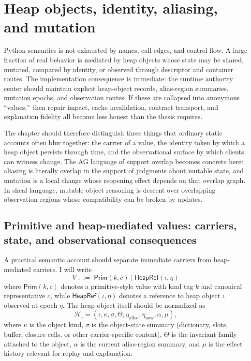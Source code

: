 \documentclass[11pt]{report}
\begin{document}
\chapter{Heap objects, identity, aliasing, and mutation}
Python semantics is not exhausted by names, call edges, and control flow. A large fraction of real behavior is mediated by heap objects whose state may be shared, mutated, compared by identity, or observed through descriptor and container routes. The implementation consequence is immediate: the runtime authority center should maintain explicit heap-object records, alias-region summaries, mutation epochs, and observation routes. If these are collapsed into anonymous ``values,'' then repair impact, cache invalidation, contract transport, and explanation fidelity all become less honest than the thesis requires.

The chapter should therefore distinguish three things that ordinary static accounts often blur together: the carrier of a value, the identity token by which a heap object persists through time, and the observational surface by which clients can witness change. The AG language of support overlap becomes concrete here: aliasing is literally overlap in the support of judgments about mutable state, and mutation is a local change whose reopening effect depends on that overlap graph. In sheaf language, mutable-object reasoning is descent over overlapping observation regions whose compatibility can be broken by updates.
\section{Primitive and heap-mediated values: carriers, state, and observational consequences}
A practical semantic account should separate immediate carriers from heap-mediated carriers. I will write
\[
V \;::=\; \mathsf{Prim}(k,c)\mid \mathsf{HeapRef}(\iota,\eta)
\]
where $\mathsf{Prim}(k,c)$ denotes a primitive-style value with kind tag $k$ and canonical representative $c$, while $\mathsf{HeapRef}(\iota,\eta)$ denotes a reference to heap object $\iota$ observed at epoch $\eta$. The heap object itself should be normalized as
\[
\mathcal{H}_{\iota} = (\iota,\kappa,\sigma,\Theta,\eta_{\mathrm{alloc}},\eta_{\mathrm{now}},\alpha,\mu),
\]
where $\kappa$ is the object kind, $\sigma$ is the object-state summary (dictionary, slots, buffer, closure cells, or other carrier-specific content), $\Theta$ is the invariant family attached to the object, $\alpha$ is the current alias-region summary, and $\mu$ is the effect history relevant for replay and explanation.
\end{document}
